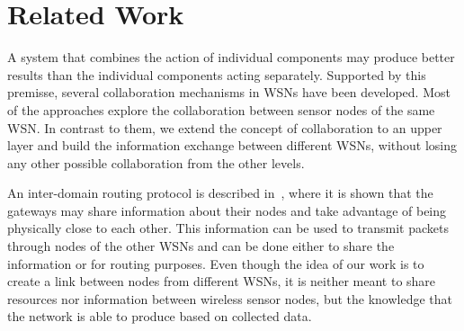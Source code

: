 \documentclass{llncs}
\begin{document}
\begin{comment}
Finally, the Round Robin Cycle for Predictions in WSNs is described 
in~\cite{Yann-Ael2005}. This algorithm was developed for WSN applications that 
require a continuous delivery of sensor measurements, such as temperature or 
traffic monitoring.  In order to build sets of nodes that provide trusted 
measurements, it considers that a sensor measurement is predictable if the 
predicted value (on average) differs less than a defined threshold from the 
actual one when using other nodes' measurements. This approach can be extended 
and adapted for the use of external data to make predictions while keeping the 
quality of the measurements, which would be enough for networks that use 
continuous monitoring applications.

\subsection{Collaboration with external systems}
\end{comment}

\section{Related Work}
\label{sec:related-work}

A system that combines the action of individual components may produce better 
results than the individual components acting separately. Supported by this 
premisse, several collaboration mechanisms in WSNs have been developed.
Most of the approaches explore the collaboration between sensor nodes of the 
same WSN. In contrast to them, we extend the concept of collaboration to an 
upper layer and build the information exchange between different WSNs, without 
losing any other possible collaboration from the other levels. 

An inter-domain routing protocol is described in~\cite{Dressler2010}, where it 
is shown that the gateways may share information about their nodes and take 
advantage of being physically close to each other. This information can be used 
to transmit packets through nodes of the other WSNs and can be done either 
to share the information or for routing purposes. Even though the idea of our 
work is to create a link between nodes from different WSNs, it is neither meant 
to share resources nor information between wireless sensor nodes, but the 
knowledge that the network is able to produce based on collected data.
\end{document}
